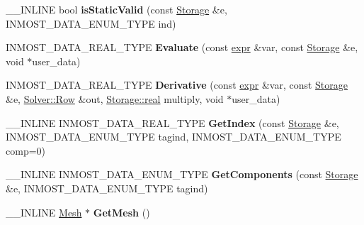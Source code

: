 \begin{DoxyCompactItemize}
\item 
\hypertarget{classINMOST_1_1Automatizator_a6ae69d02eb607b39c5000c39882c484d}{\-\_\-\-\_\-\-I\-N\-L\-I\-N\-E bool {\bfseries is\-Static\-Valid} (const \hyperlink{classINMOST_1_1Storage}{Storage} \&e, I\-N\-M\-O\-S\-T\-\_\-\-D\-A\-T\-A\-\_\-\-E\-N\-U\-M\-\_\-\-T\-Y\-P\-E ind)}\label{classINMOST_1_1Automatizator_a6ae69d02eb607b39c5000c39882c484d}

\item 
\hypertarget{classINMOST_1_1Automatizator_a817df1c8880db2abfa5a75745b81814a}{I\-N\-M\-O\-S\-T\-\_\-\-D\-A\-T\-A\-\_\-\-R\-E\-A\-L\-\_\-\-T\-Y\-P\-E {\bfseries Evaluate} (const \hyperlink{classINMOST_1_1expr}{expr} \&var, const \hyperlink{classINMOST_1_1Storage}{Storage} \&e, void $\ast$user\-\_\-data)}\label{classINMOST_1_1Automatizator_a817df1c8880db2abfa5a75745b81814a}

\item 
\hypertarget{classINMOST_1_1Automatizator_a43ef39e195bffdfb7615ff01e66f7867}{I\-N\-M\-O\-S\-T\-\_\-\-D\-A\-T\-A\-\_\-\-R\-E\-A\-L\-\_\-\-T\-Y\-P\-E {\bfseries Derivative} (const \hyperlink{classINMOST_1_1expr}{expr} \&var, const \hyperlink{classINMOST_1_1Storage}{Storage} \&e, \hyperlink{classINMOST_1_1Solver_1_1Row}{Solver\-::\-Row} \&out, \hyperlink{classINMOST_1_1Storage_a853346784b4a5822a7fac54d8f10f805}{Storage\-::real} multiply, void $\ast$user\-\_\-data)}\label{classINMOST_1_1Automatizator_a43ef39e195bffdfb7615ff01e66f7867}

\item 
\hypertarget{classINMOST_1_1Automatizator_a55fa3c6b0c26f26037954f87a86854a3}{\-\_\-\-\_\-\-I\-N\-L\-I\-N\-E I\-N\-M\-O\-S\-T\-\_\-\-D\-A\-T\-A\-\_\-\-R\-E\-A\-L\-\_\-\-T\-Y\-P\-E {\bfseries Get\-Index} (const \hyperlink{classINMOST_1_1Storage}{Storage} \&e, I\-N\-M\-O\-S\-T\-\_\-\-D\-A\-T\-A\-\_\-\-E\-N\-U\-M\-\_\-\-T\-Y\-P\-E tagind, I\-N\-M\-O\-S\-T\-\_\-\-D\-A\-T\-A\-\_\-\-E\-N\-U\-M\-\_\-\-T\-Y\-P\-E comp=0)}\label{classINMOST_1_1Automatizator_a55fa3c6b0c26f26037954f87a86854a3}

\item 
\hypertarget{classINMOST_1_1Automatizator_a571b357aebd31b957e1fdc328e270e58}{\-\_\-\-\_\-\-I\-N\-L\-I\-N\-E I\-N\-M\-O\-S\-T\-\_\-\-D\-A\-T\-A\-\_\-\-E\-N\-U\-M\-\_\-\-T\-Y\-P\-E {\bfseries Get\-Components} (const \hyperlink{classINMOST_1_1Storage}{Storage} \&e, I\-N\-M\-O\-S\-T\-\_\-\-D\-A\-T\-A\-\_\-\-E\-N\-U\-M\-\_\-\-T\-Y\-P\-E tagind)}\label{classINMOST_1_1Automatizator_a571b357aebd31b957e1fdc328e270e58}

\item 
\hypertarget{classINMOST_1_1Automatizator_a40637bfaa6d8bc507fa6f49afc4472f7}{\-\_\-\-\_\-\-I\-N\-L\-I\-N\-E \hyperlink{classINMOST_1_1Mesh}{Mesh} $\ast$ {\bfseries Get\-Mesh} ()}\label{classINMOST_1_1Automatizator_a40637bfaa6d8bc507fa6f49afc4472f7}


\end{DoxyCompactItemize}
